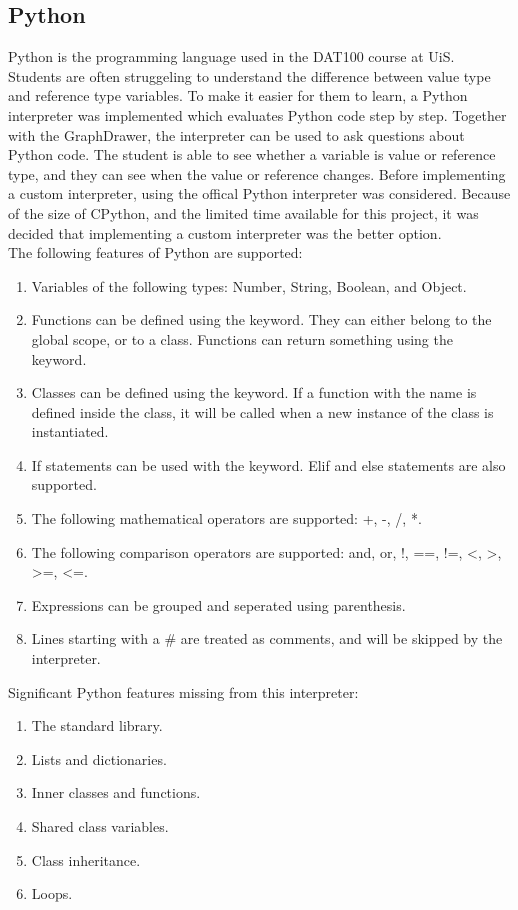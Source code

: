 \subsection{Python}
Python is the programming language used in the DAT100 course at UiS. Students are often struggeling to understand the difference between value type and reference type variables. To make it easier for them to learn, a Python interpreter was implemented which evaluates Python code step by step. Together with the GraphDrawer, the interpreter can be used to ask questions about Python code. The student is able to see whether a variable is value or reference type, and they can see when the value or reference changes. Before implementing a custom interpreter, using the offical Python interpreter was considered. Because of the size of CPython, and the limited time available for this project, it was decided that implementing a custom interpreter was the better option.
\\[11pt]
The following features of Python are supported:
\begin{enumerate}
    \item Variables of the following types: Number, String, Boolean, and Object.
    \item Functions can be defined using the  keyword. They can either belong to the global scope, or to a class. Functions can return something using the  keyword.
    \item Classes can be defined using the  keyword. If a function with the  name is defined inside the class, it will be called when a new instance of the class is instantiated.
    \item If statements can be used with the  keyword. Elif and else statements are also supported.
    \item The following mathematical operators are supported: +, -, /, *.
    \item The following comparison operators are supported: and, or, !, ==, !=, <, >, >=, <=.
    \item Expressions can be grouped and seperated using parenthesis.
    \item Lines starting with a \# are treated as comments, and will be skipped by the interpreter.
\end{enumerate}
Significant Python features missing from this interpreter:
\begin{enumerate}
    \item The standard library.
    \item Lists and dictionaries.
    \item Inner classes and functions.
    \item Shared class variables.
    \item Class inheritance.
    \item Loops.
\end{enumerate}
